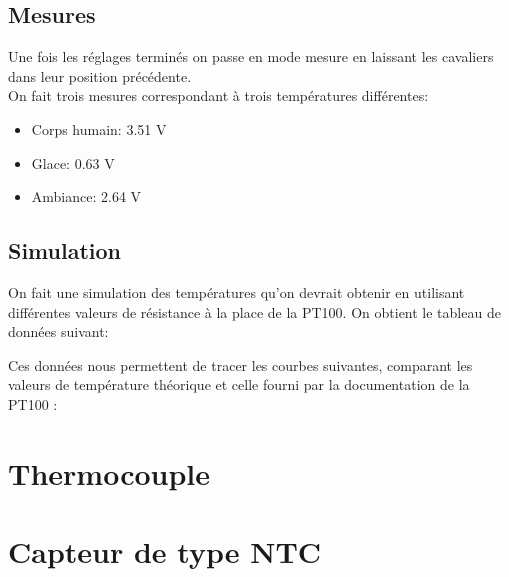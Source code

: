 \documentclass[a4paper,12pt]{article}
\begin{document}
    \subsection{Mesures}
      \par Une fois les réglages terminés on passe en mode mesure en laissant les cavaliers dans leur position précédente.\\
      On fait trois mesures correspondant à trois températures différentes:
      \begin{itemize}
        \item Corps humain: 3.51 V
        \item Glace: 0.63 V
        \item Ambiance: 2.64 V
      \end{itemize}

    \subsection{Simulation}
      \par On fait une simulation des températures qu'on devrait obtenir en utilisant différentes valeurs de résistance à la place de la PT100. On obtient le tableau de données suivant:

      \par Ces données nous permettent de tracer les courbes suivantes, comparant les valeurs de température théorique et celle fourni par la documentation de la PT100 :

    \newpage

  \section{Thermocouple}

    \newpage

  \section{Capteur de type NTC}
\end{document}
